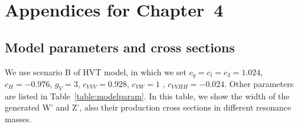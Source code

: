 \newpage
\chapter{Appendices for Chapter~4 }
\label{appendix:appendix4}

\section{Model parameters and cross sections}
\label{appendix:modelParam}

We use scenario B of HVT model, in which 
we set $c_{q} = c_{l} = c_{3} = 1.024$, $c_{H} = -0.976$, $g_{V} = 3$, 
$c_{VVV} = 0.928$, $c_{VW} = 1$ , $c_{VVHH} = -0.024$. Other parameters 
are listed in Table~\ref{table:modelparam}.
In this table, we show the width of the generated W' and Z', also their production
 cross 
sections in different resonance masses.  

